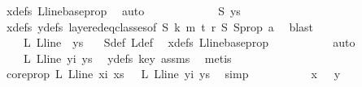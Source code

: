 \begin{isabellebody}
\ xdefs\ L{\isacharunderscore}{\kern0pt}line{\isacharunderscore}{\kern0pt}base{\isacharunderscore}{\kern0pt}prop\ \isamarkupfalse%
\ auto\isanewline
\ \ \ \ \ \ \isamarkupfalse%
\ \isamarkupfalse%
\ {\isachardoublequoteopen}\ {\isachardot}{\kern0pt}{\isachardot}{\kern0pt}{\isachardot}{\kern0pt}\ {\isacharequal}{\kern0pt}\ {\isasymchi}S\ ys{\isachardoublequoteclose}\ \isamarkupfalse%
\ xdefs\ ydefs\ layered{\isacharunderscore}{\kern0pt}eq{\isacharunderscore}{\kern0pt}classes{\isacharbrackleft}{\kern0pt}of\ S\ k\ m\ t\ r\ {\isasymchi}S{\isacharbrackright}{\kern0pt}\ S{\isacharunderscore}{\kern0pt}prop\ a\ \isamarkupfalse%
\ blast\isanewline
\ \ \ \ \ \ \isamarkupfalse%
\ \isamarkupfalse%
\ {\isachardoublequoteopen}\ {\isachardot}{\kern0pt}{\isachardot}{\kern0pt}{\isachardot}{\kern0pt}\ {\isacharequal}{\kern0pt}\ {\isasymchi}L\ {\isacharparenleft}{\kern0pt}L{\isacharunderscore}{\kern0pt}line\ {}{\isacharparenright}{\kern0pt}\ ys{\isachardoublequoteclose}\ \ \isamarkupfalse%
\ {\isasymchi}S{\isacharunderscore}{\kern0pt}def\ {\isasymchi}L{\isacharunderscore}{\kern0pt}def\ \isamarkupfalse%
\ xdefs\ L{\isacharunderscore}{\kern0pt}line{\isacharunderscore}{\kern0pt}base{\isacharunderscore}{\kern0pt}prop\ \isanewline
\ \ \ \ \ \ \ \ \isamarkupfalse%
\ auto\isanewline
\ \ \ \ \ \ \isamarkupfalse%
\ \isamarkupfalse%
\ {\isachardoublequoteopen}\ {\isachardot}{\kern0pt}{\isachardot}{\kern0pt}{\isachardot}{\kern0pt}\ {\isacharequal}{\kern0pt}\ {\isasymchi}L\ {\isacharparenleft}{\kern0pt}L{\isacharunderscore}{\kern0pt}line\ yi{\isacharparenright}{\kern0pt}\ ys{\isachardoublequoteclose}\ \isamarkupfalse%
\ ydefs\ key\ assms{\isacharparenleft}{\kern0pt}{}{\isacharparenright}{\kern0pt}\ \isamarkupfalse%
\ metis\isanewline
\ \ \ \ \ \ \isamarkupfalse%
\ \isamarkupfalse%
\ core{\isacharunderscore}{\kern0pt}prop{\isacharcolon}{\kern0pt}\ {\isachardoublequoteopen}{\isasymchi}L\ {\isacharparenleft}{\kern0pt}L{\isacharunderscore}{\kern0pt}line\ xi{\isacharparenright}{\kern0pt}\ xs\ {\isacharequal}{\kern0pt}\ \ {\isasymchi}L\ {\isacharparenleft}{\kern0pt}L{\isacharunderscore}{\kern0pt}line\ yi{\isacharparenright}{\kern0pt}\ ys{\isachardoublequoteclose}\ \isamarkupfalse%
\ simp\isanewline
\ \ \ \ \ \ \isamarkupfalse%
\ \isamarkupfalse%
\ {\isachardoublequoteopen}{\isasymchi}\ x\ {\isacharequal}{\kern0pt}\ {\isasymchi}\ y{\isachardoublequoteclose}\ \isamarkupfalse%

\end{isabellebody}
